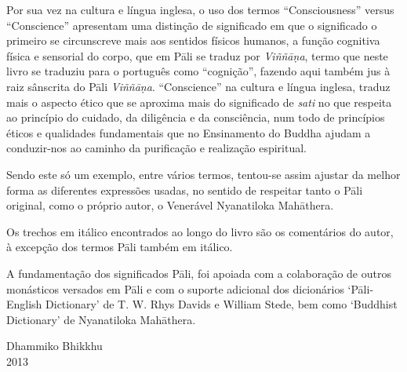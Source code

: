 Por sua vez na cultura e língua inglesa, o uso dos termos ``Consciousness''
versus ``Conscience'' apresentam uma distinção de significado em que o
significado o primeiro se circunscreve mais aos sentidos físicos humanos, a
função cognitiva física e sensorial do corpo, que em Pāli se traduz por
\emph{Viññāṇa}, termo que neste livro se traduziu para o português como
``cognição'', fazendo aqui também jus à raiz sânscrita do Pāli \emph{Viññāṇa}.
``Conscience'' na cultura e língua inglesa, traduz mais o aspecto ético que se
aproxima mais do significado de \emph{sati} no que respeita ao princípio do
cuidado, da diligência e da consciência, num todo de princípios éticos e
qualidades fundamentais que no Ensinamento do Buddha ajudam a conduzir-nos ao
caminho da purificação e realização espiritual.

Sendo este só um exemplo, entre vários termos, tentou-se assim ajustar da melhor
forma as diferentes expressões usadas, no sentido de respeitar tanto o Pāli
original, como o próprio autor, o Venerável Nyanatiloka Mahāthera.

Os trechos em itálico encontrados ao longo do livro são os comentários do autor,
à excepção dos termos Pāli também em itálico.

A fundamentação dos significados Pāli, foi apoiada com a colaboração de outros
monásticos versados em Pāli e com o suporte adicional dos dicionários
`Pāli-English Dictionary' de T. W. Rhys Davids e William Stede, bem como
`Buddhist Dictionary' de Nyanatiloka Mahāthera.

\bigskip

{\raggedleft
  Dhammiko Bhikkhu\\
  2013
\par}
